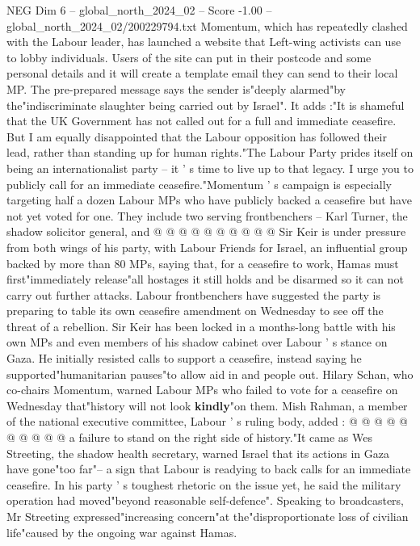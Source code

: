 \begin{textsample}{NEG Dim 6 – global\_north\_2024\_02 – Score -1.00 – global\_north\_2024\_02/200229794.txt}  \label{ex:f6_neg_279}
Momentum, which has repeatedly clashed with the Labour leader, has launched a website that Left-wing activists can use to lobby individuals.
Users of the site can put in their postcode and some personal details and it will create a template email they can send to their local MP.
The pre-prepared message says the sender is"deeply alarmed"by the"indiscriminate slaughter being carried out by Israel".
It adds :"It is shameful that the UK Government has not called out for a full and immediate ceasefire.
But I am equally disappointed that the Labour opposition has followed their lead, rather than standing up for human rights."The Labour Party prides itself on being an internationalist party -- it ' s time to live up to that legacy.
I urge you to publicly call for an immediate ceasefire."Momentum ' s campaign is especially targeting half a dozen Labour MPs who have publicly backed a ceasefire but have not yet voted for one.
They include two serving frontbenchers -- Karl Turner, the shadow solicitor general, and @ @ @ @ @ @ @ @ @ @ Sir Keir is under pressure from both wings of his party, with Labour Friends for Israel, an influential group backed by more than 80 MPs, saying that, for a ceasefire to work, Hamas must first"immediately release"all hostages it still holds and be disarmed so it can not carry out further attacks.
Labour frontbenchers have suggested the party is preparing to table its own ceasefire amendment on Wednesday to see off the threat of a rebellion.
Sir Keir has been locked in a months-long battle with his own MPs and even members of his shadow cabinet over Labour ' s stance on Gaza.
He initially resisted calls to support a ceasefire, instead saying he supported"humanitarian pauses"to allow aid in and people out.
Hilary Schan, who co-chairs Momentum, warned Labour MPs who failed to vote for a ceasefire on Wednesday that"history will not look \textbf{kindly}"on them.
Mish Rahman, a member of the national executive committee, Labour ' s ruling body, added : @ @ @ @ @ @ @ @ @ @ a failure to stand on the right side of history."It came as Wes Streeting, the shadow health secretary, warned Israel that its actions in Gaza have gone"too far"-- a sign that Labour is readying to back calls for an immediate ceasefire.
In his party ' s toughest rhetoric on the issue yet, he said the military operation had moved"beyond reasonable self-defence".
Speaking to broadcasters, Mr Streeting expressed"increasing concern"at the"disproportionate loss of civilian life"caused by the ongoing war against Hamas.

\end{textsample}
